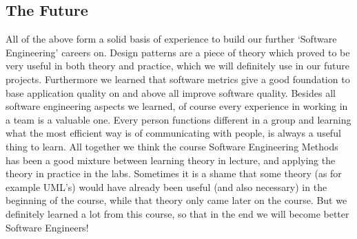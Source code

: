 \subsection{The Future}
All of the above form a solid basis of experience to build our further `Software Engineering' careers on. Design patterns are a piece of theory which proved to be very useful in both theory and practice, which we will definitely use in our future projects. Furthermore we learned that software metrics give a good foundation to base application quality on and above all improve software quality. Besides all software engineering aspects we learned, of course every experience in working in a team is a valuable one. Every person functions different in a group and learning what the most efficient way is of communicating with people, is always a useful thing to learn. All together we think the course Software Engineering Methods has been a good mixture between learning theory in lecture, and applying the theory in practice in the labs. Sometimes it is a shame that some theory (as for example UML's) would have already been useful (and also necessary) in the beginning of the course, while that theory only came later on the course. But we definitely learned a lot from this course, so that in the end we will become better Software Engineers! 

